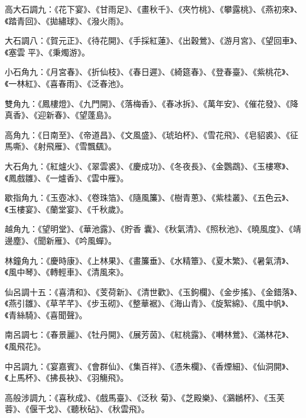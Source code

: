 \begin{pinyinscope}
 高大石調九：《花下宴》、《甘雨足》、《畫秋千》、《夾竹桃》、《攀露桃》、《燕初來》、《踏青回》、《拋繡球》、《潑火雨》。



 大石調八：《賀元正》、《待花開》、《手採紅蓮》、《出穀鶯》、《游月宮》、《望回車》、《塞雲
 平》、《秉燭游》。



 小石角九：《月宮春》、《折仙枝》、《春日遲》、《綺筵春》、《登春臺》、《紫桃花》、《一林紅》、《喜春雨》、《泛春池》。



 雙角九：《鳳樓燈》、《九門開》、《落梅香》、《春冰拆》、《萬年安》、《催花發》、《降真香》、《迎新春》、《望蓬島》。



 高角九：《日南至》、《帝道昌》、《文風盛》、《琥珀杯》、《雪花飛》、《皂貂裘》、《征馬嘶》、《射飛雁》、《雪飄颻》。



 大石角九：《紅爐火》、《翠雲裘》、《慶成功》、《冬夜長》、《金鸚鵡》、《玉樓寒》、《鳳戲雛》、《一爐香》、《雲中雁》。



 歇指角九：《玉壺冰》、《卷珠箔》、《隨風簾》、《樹青蔥》、《紫桂叢》、《五色云》、《玉樓宴》、《蘭堂宴》、《千秋歲》。



 越角九：《望明堂》、《華池露》、《貯香
 囊》、《秋氣清》、《照秋池》、《曉風度》、《靖邊塵》、《聞新雁》、《吟風蟬》。



 林鐘角九：《慶時康》、《上林果》、《畫簾垂》、《水精簟》、《夏木繁》、《暑氣清》、《風中琴》、《轉輕車》、《清風來》。



 仙呂調十五：《喜清和》、《芰荷新》、《清世歡》、《玉鉤欄》、《金步搖》、《金錯落》、《燕引雛》、《草芊芊》、《步玉砌》、《整華裾》、《海山青》、《旋絮綿》、《風中帆》、《青絲騎》、《喜聞聲》。



 南呂調七：《春景麗》、《牡丹開》、《展芳茵》、《紅桃露》、《囀林鶯》、《滿林花》、《風飛花》。



 中呂調九：《宴嘉賓》、《會群仙》、《集百祥》、《憑朱欄》、《香煙細》、《仙洞開》、《上馬杯》、《拂長袂》、《羽觴飛》。



 高般涉調九：《喜秋成》、《戲馬臺》、《泛秋
 菊》、《芝殿樂》、《鸂鶒杯》、《玉芙蓉》、《偃干戈》、《聽秋砧》、《秋雲飛》。




\end{pinyinscope}
